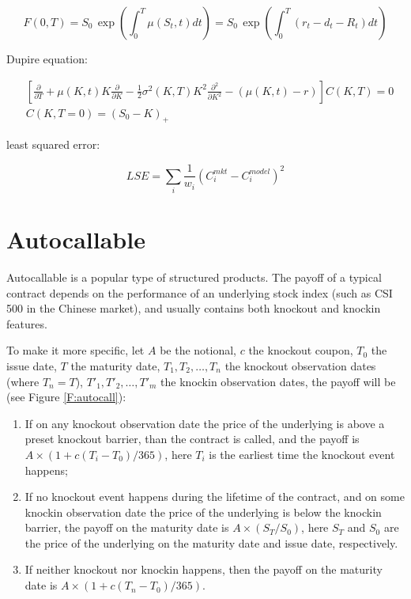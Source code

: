 \[
	F(0,T) = S_0 \, \exp \left( \int_0^T \mu(S_t,t) dt \right)
	       = S_0 \, \exp \left( \int_0^T (r_t - d_t - R_t) dt \right)
\]

Dupire equation:

\begin{align*}
	& \left[
	\frac{\partial}{\partial T} + \mu(K,t) K\frac{\partial}{\partial K}
	- \frac{1}{2} \sigma^2(K,T) K^2 \frac{\partial^2}{\partial K^2} 
	- (\mu(K,t) - r)
	\right] C(K,T) = 0  \\
	& C(K,T=0) = (S_0 - K)_+
\end{align*}

least squared error:

\[
	LSE = \sum_i \frac{1}{w_i} (C_i^{mkt} - C_i^{model})^2
\]


\section{Autocallable}

Autocallable is a popular type of structured products. The payoff of a typical 
contract depends on the performance of an underlying stock index (such as
CSI 500 in the Chinese market), and usually contains both knockout and knockin 
features.

To make it more specific, 
let $A$ be the notional, $c$ the knockout coupon, $T_0$ the issue date, $T$
the maturity date, $T_1,T_2,\dots,T_n$ the knockout observation dates (where
$T_n=T$), $T'_1,T'_2,\dots,T'_m$ the knockin observation dates, 
the payoff will be (see Figure \ref{F:autocall}):

\begin{enumerate}
\item If on any knockout observation date the price of the underlying is above a
preset knockout barrier, than the contract is called, and the payoff is
$A\times(1+c(T_i-T_0)/365)$, here $T_i$ is the earliest time the knockout event
happens;
\item If no knockout event happens during the lifetime of the contract, and on
some knockin observation date the price of the underlying is below the knockin
barrier, the payoff on the maturity date is $A\times(S_T/S_0)$, here $S_T$ and
$S_0$ are the price of the underlying on the maturity date and issue date,
respectively.
\item If neither knockout nor knockin happens, then the payoff on the maturity
date is $A\times(1+c(T_n-T_0)/365)$. 
\end{enumerate}



